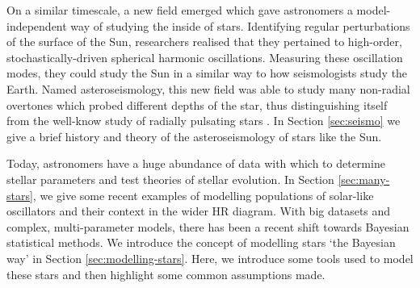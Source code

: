 On a similar timescale, a new field emerged which gave astronomers a model-independent way of studying the inside of stars. Identifying regular perturbations of the surface of the Sun, researchers realised that they pertained to high-order, stochastically-driven spherical harmonic oscillations. Measuring these oscillation modes, they could study the Sun in a similar way to how seismologists study the Earth. Named asteroseismology, this new field was able to study many non-radial overtones which probed different depths of the star, thus distinguishing itself from the well-know study of radially pulsating stars \citep[e.g. Cepheid variables;][]{Leavitt1908}. In Section \ref{sec:seismo} we give a brief history and theory of the asteroseismology of stars like the Sun.


Today, astronomers have a huge abundance of data with which to determine stellar parameters and test theories of stellar evolution. In Section \ref{sec:many-stars}, we give some recent examples of modelling populations of solar-like oscillators and their context in the wider HR diagram. With big datasets and complex, multi-parameter models, there has been a recent shift towards Bayesian statistical methods. We introduce the concept of modelling stars `the Bayesian way' in Section \ref{sec:modelling-stars}. Here, we introduce some tools used to model these stars and then highlight some common assumptions made.





